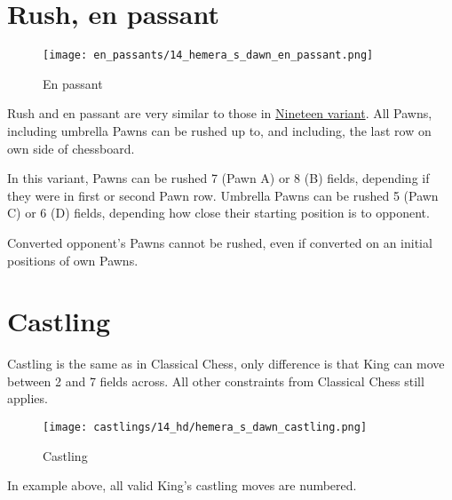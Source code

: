 \clearpage %

\section*{Rush, en passant}

\vspace*{-1.2\baselineskip}
\noindent
\begin{figure}[!h]
\texttt{[image: en\_passants/14\_hemera\_s\_dawn\_en\_passant.png]}
\caption{En passant}
\label{fig:14_hemera_s_dawn_en_passant}
\end{figure}

Rush and en passant are very similar to those in \hyperref[fig:12_nineteen_en_passant]{Nineteen variant}.
All Pawns, including umbrella Pawns can be rushed up to, and including, the last row on own side of
chessboard.

In this variant, Pawns can be rushed 7 (Pawn A) or 8 (B) fields, depending if they were in first or second
Pawn row. Umbrella Pawns can be rushed 5 (Pawn C) or 6 (D) fields, depending how close their starting position
is to opponent.

Converted opponent's Pawns cannot be rushed, even if converted on an initial positions
of own Pawns.

\clearpage %

\section*{Castling}

Castling is the same as in Classical Chess, only difference is that King can move between 2 and 7 fields across.
All other constraints from Classical Chess still applies.

\noindent
\begin{figure}[!h]
\texttt{[image: castlings/14\_hd/hemera\_s\_dawn\_castling.png]}
\caption{Castling}
\label{fig:hemera_s_dawn_castling}
\end{figure}

In example above, all valid King's castling moves are numbered.

